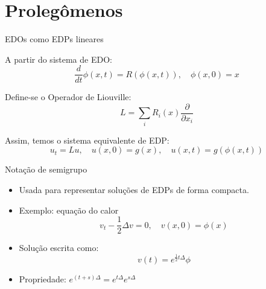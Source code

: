 \section{Prolegômenos}

\begin{frame}{EDOs como EDPs lineares}
	
	A partir do sistema de EDO:
	\begin{equation*}
		\frac{d}{dt} \phi(x,t) = R(\phi(x,t)), \quad \phi(x,0) = x
	\end{equation*}
	
	Define-se o Operador de Liouville:
	\begin{equation*}
		L = \sum_i R_i(x) \frac{\partial}{\partial x_i}
	\end{equation*}
	
	Assim, temos o sistema equivalente de EDP:
	\begin{equation*}
		u_t = Lu, \quad u(x,0) = g(x), \quad u(x,t) = g(\phi(x,t))
	\end{equation*}
	
\end{frame}

\begin{frame}{Notação de semigrupo}
	\begin{itemize}
		\item Usada para representar soluções de EDPs de forma compacta.
		\item Exemplo: equação do calor
		      \begin{equation*}
		      	v_t - \frac{1}{2}\Delta v = 0, \quad v(x,0) = \phi(x)
		      \end{equation*}
		\item Solução escrita como:
		      \begin{equation*}
		      	v(t) = e^{\frac{1}{2}t\Delta} \phi
		      \end{equation*}
		\item Propriedade: $e^{(t+s)\Delta} = e^{t\Delta} e^{s\Delta}$
	\end{itemize}
\end{frame}


